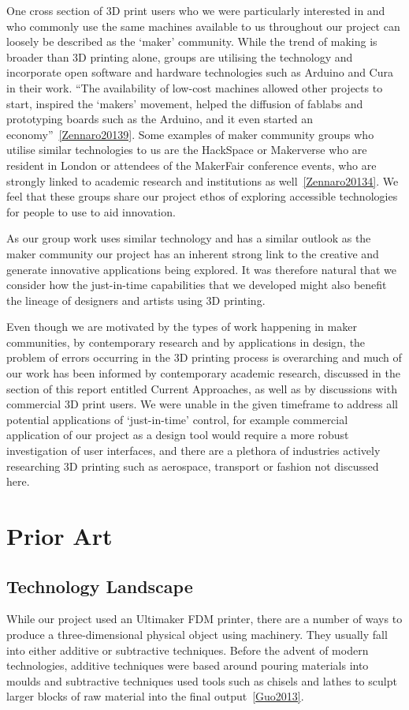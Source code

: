 \documentclass[11pt]{report} %
\begin{document}
One cross section of 3D print users who we were particularly interested in and who commonly use the same machines available to us throughout our project can loosely be described as the `maker' community. While the trend of making is broader than 3D printing alone, groups are utilising the technology and incorporate open software and hardware technologies such as Arduino and Cura in their work. ``The availability of low-cost machines allowed other projects to start, inspired the `makers' movement, helped the diffusion of fablabs and prototyping boards such as the Arduino, and it even started an economy''~\ref{Zennaro20139}. Some examples of maker community groups who utilise similar technologies to us are the HackSpace or Makerverse who are resident in London or attendees of the MakerFair conference events, who are strongly linked to academic research and institutions as well~\ref{Zennaro20134}. We feel that these groups share our project ethos of exploring accessible technologies for people to use to aid innovation. 

As our group work uses similar technology and has a similar outlook as the maker community our project has an inherent strong link to the creative and generate innovative applications being explored. It was therefore natural that we consider how the just-in-time capabilities that we developed might also benefit the lineage of designers and artists using 3D printing.  

Even though we are motivated by the types of work happening in maker communities, by contemporary research and by applications in design, the problem of errors occurring in the 3D printing process is overarching and much of our work has been informed by contemporary academic research, discussed in the section of this report entitled Current Approaches, as well as by discussions with commercial 3D print users. We were unable in the given timeframe to address all potential applications of `just-in-time' control, for example commercial application of our project as a design tool would require a more robust investigation of user interfaces, and there are a plethora of industries actively researching 3D printing such as aerospace, transport or fashion not discussed here.





\chapter{Prior Art}
\section{Technology Landscape}
\label{section:TechnologyLandscape}
While our project used an Ultimaker FDM printer, there are a number of ways to produce a three-dimensional physical object using machinery. They usually fall into either additive or subtractive techniques. Before the advent of modern technologies, additive techniques were based around pouring materials into moulds and subtractive techniques used tools such as chisels and lathes to sculpt larger blocks of raw material into the final output~\ref{Guo2013}.
\end{document}

